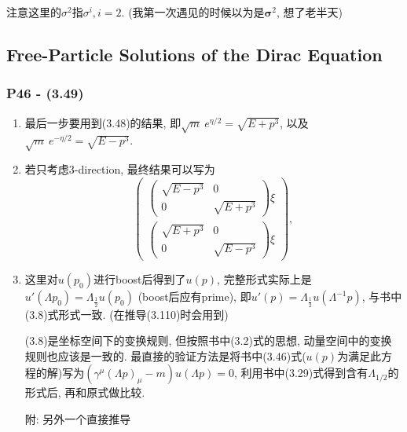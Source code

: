 \documentclass[cn,hazy,blue,11pt,device=normal,chinesefont=founder]{elegantnote}
\begin{document}
注意这里的$\sigma^2$指$\sigma^i, i=2$. (我第一次遇见的时候以为是$\boldsymbol{\sigma}^2$, 想了老半天)

\subsection{Free-Particle Solutions of the Dirac Equation}

\subsubsection{P46 - (3.49)}\label{subsubsec: Boost_u_p}

\begin{enumerate}
  \item 最后一步要用到(3.48)的结果, 即$\sqrt{m}\ e^{\eta/2} = \sqrt{E + p^3}$, 以及$\sqrt{m}\ e^{-\eta/2} = \sqrt{E - p^3}$. 
  \item 若只考虑3-direction, 最终结果可以写为
  \begin{equation}
    \left( \begin{array}{c} \left( \begin{array}{cc} \sqrt{E-p^3} & 0 \\ 0 & \sqrt{E+p^3} \end{array} \right)\xi \\ \left( \begin{array}{cc} \sqrt{E+p^3} & 0 \\ 0 & \sqrt{E-p^3} \end{array} \right)\xi \end{array} \right), 
  \end{equation}
  \item 这里对$u(p_0)$进行boost后得到了$u(p)$, 完整形式实际上是$u'(\Lambda p_0) = \Lambda_{\frac{1}{2}}u(p_0)$ (boost后应有prime), 即$u'(p) = \Lambda_{\frac{1}{2}}u(\Lambda^{-1}p)$, 与书中(3.8)式形式一致. (在推导(3.110)时会用到)
  \begin{note}
    (3.8)是坐标空间下的变换规则, 但按照书中(3.2)式的思想, 动量空间中的变换规则也应该是一致的. 最直接的验证方法是将书中(3.46)式($u(p)$为满足此方程的解)写为$(\gamma^\mu(\Lambda p)_\mu - m)u(\Lambda p) = 0$, 利用书中(3.29)式得到含有$\Lambda_{1/2}$的形式后, 再和原式做比较. 

    \mbox{}

    附: 另外一个直接推导


\end{note}
\end{enumerate}
\end{document}

